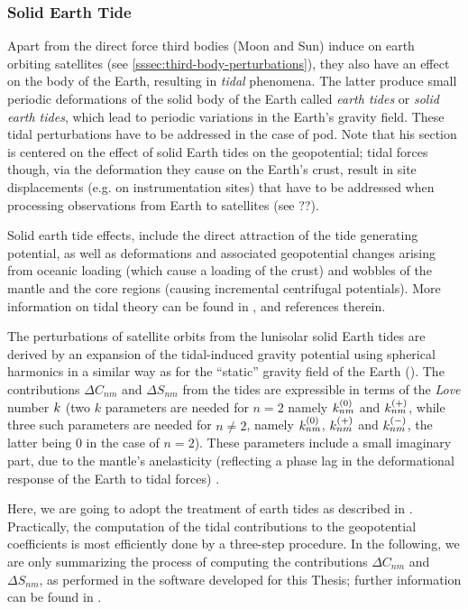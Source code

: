 \subsubsection{Solid Earth Tide}\label{sssec:earth-tide-perturbations}

Apart from the direct force third bodies (Moon and Sun) induce on earth orbiting 
satellites (see \autoref{sssec:third-body-perturbations}), they also have an effect on 
the body of the Earth, resulting in \emph{tidal} phenomena. The latter produce 
small periodic deformations of the solid body of the Earth called \emph{earth tides} 
or \emph{solid earth tides}, which lead to periodic variations in the Earth's gravity 
field. These tidal perturbations have to be addressed in the case of \gls{pod}. 
Note that his section is centered on the effect of solid Earth tides on the geopotential; 
tidal forces though, via the deformation they cause on the Earth's crust, result in 
site displacements (e.g. on instrumentation sites) that have to be addressed when 
processing observations from Earth to satellites (see ??).

Solid earth tide effects, include the direct attraction of the tide generating 
potential, as well as deformations and associated geopotential changes arising 
from oceanic loading (which cause a loading of the crust) and wobbles of the 
mantle and the core regions (causing incremental centrifugal potentials). More 
information on tidal theory can be found in \cite{Wilhelm1997}, \cite{iers2010} 
and references therein. 

The perturbations of satellite orbits from the lunisolar solid Earth tides are
derived by an expansion of the tidal-induced gravity potential using spherical 
harmonics in a similar way as for the ``static'' gravity field of the Earth 
(\cite{Montenbruck2000}). The contributions $\Delta C_{nm}$ and $\Delta S_{nm}$ 
from the tides are expressible in terms of the \emph{Love} number $k$ (two 
$k$ parameters are needed for $n=2$ namely $k ^{(0)}_{nm}$ and $k ^{(+)}_{nm}$, 
while three such parameters are needed for $n \ne 2$, namely $k ^{(0)}_{nm}$, 
$k ^{(+)}_{nm}$ and $k ^{(-)}_{nm}$, the latter being $0$ in the case 
of $n=2$). These parameters include a small imaginary part, due to the mantle's 
anelasticity (reflecting a phase lag in the deformational response of the Earth 
to tidal forces) \cite{iers2010}.

Here, we are going to adopt the treatment of earth tides as described in 
\cite{iers2010}. Practically, the computation of the tidal contributions to the 
geopotential coefficients is most efficiently done by a three-step procedure. 
In the following, we are only summarizing the process of computing the contributions 
$\Delta C_{nm}$ and $\Delta S_{nm}$, as performed in the software developed for 
this Thesis; further information can be found in \cite{iers2010}.
 
